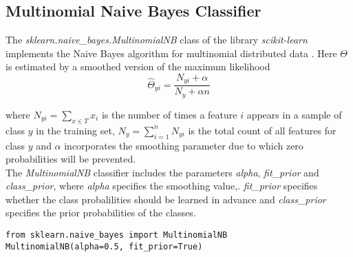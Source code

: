 \documentclass[a4paper, 11pt,titlepage,oneside,openany]{book}
\begin{document}
\subsection{Multinomial Naive Bayes Classifier}
The \textit{sklearn.naive\_bayes.MultinomialNB} class of the library \textit{scikit-learn} implements the Naive Bayes algorithm for multinomial distributed data \cite{codemulinomialnb}. Here $\Theta$ is estimated by a smoothed version of the maximum likelihood
\[
\hat{\Theta}_{yi}=\frac{N_{yi}+\alpha}{N_y + \alpha n}
\]

\noindent where $N_{yi}=\sum_{x \in T}x_i$ is the number of times a feature $i$ appears in a sample of class $y$ in the training set, $N_y=\sum_{i=1}^{n}N_{yi}$ is the total count of all features for class $y$ and $\alpha$ incorporates the smoothing parameter due to which zero probabilities will be prevented.
\\ The \textit{MultinomialNB} classifier includes the parameters \textit{alpha}, \textit{fit\_prior} and \textit{class\_prior}, where \textit{alpha} specifies the smoothing value,. \textit{fit\_prior} specifies whether the class probalilities should be learned in advance and \textit{class\_prior} specifies the prior probabilities of the classes.\\
\noindent
\begin{minipage}{\linewidth}
	\begin{lstlisting}
from sklearn.naive_bayes import MultinomialNB
MultinomialNB(alpha=0.5, fit_prior=True)
	\end{lstlisting}
\end{minipage} \\
\end{document}
